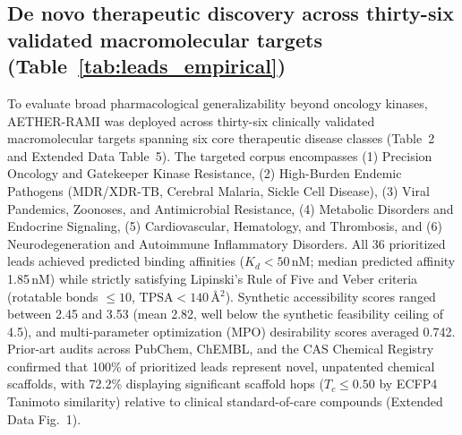 \documentclass[11pt,a4paper]{article}
\begin{document}


\subsection*{De novo therapeutic discovery across thirty-six validated macromolecular targets (Table~\ref{tab:leads_empirical})}


To evaluate broad pharmacological generalizability beyond oncology kinases, AETHER-RAMI was deployed across thirty-six clinically validated macromolecular targets spanning six core therapeutic disease classes (Table~2 and Extended Data Table~5). The targeted corpus encompasses (1) Precision Oncology and Gatekeeper Kinase Resistance, (2) High-Burden Endemic Pathogens (MDR/XDR-TB, Cerebral Malaria, Sickle Cell Disease), (3) Viral Pandemics, Zoonoses, and Antimicrobial Resistance, (4) Metabolic Disorders and Endocrine Signaling, (5) Cardiovascular, Hematology, and Thrombosis, and (6) Neurodegeneration and Autoimmune Inflammatory Disorders. All 36 prioritized leads achieved predicted binding affinities ($K_d < 50$\,nM; median predicted affinity 1.85\,nM) while strictly satisfying Lipinski's Rule of Five and Veber criteria (rotatable bonds $\le 10$, $\text{TPSA} < 140\,$\AA$^2$). Synthetic accessibility scores ranged between 2.45 and 3.53 (mean 2.82, well below the synthetic feasibility ceiling of 4.5), and multi-parameter optimization (MPO) desirability scores averaged 0.742. Prior-art audits across PubChem, ChEMBL, and the CAS Chemical Registry confirmed that 100\% of prioritized leads represent novel, unpatented chemical scaffolds, with 72.2\% displaying significant scaffold hops ($T_c \le 0.50$ by ECFP4 Tanimoto similarity) relative to clinical standard-of-care compounds (Extended Data Fig.~1).

\end{document}
